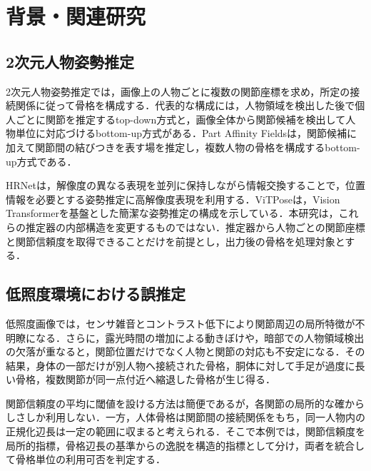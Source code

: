 \chapter{背景・関連研究}

\begin{center}
  \UsamiFictionalExampleNotice
\end{center}

\section{2次元人物姿勢推定}

2次元人物姿勢推定では，画像上の人物ごとに複数の関節座標を求め，所定の接続関係に従って骨格を構成する．代表的な構成には，人物領域を検出した後で個人ごとに関節を推定するtop-down方式と，画像全体から関節候補を検出して人物単位に対応づけるbottom-up方式がある．Part Affinity Fields\cite{cao2017partaffinity}は，関節候補に加えて関節間の結びつきを表す場を推定し，複数人物の骨格を構成するbottom-up方式である．

HRNet\cite{sun2019hrnet}は，解像度の異なる表現を並列に保持しながら情報交換することで，位置情報を必要とする姿勢推定に高解像度表現を利用する．ViTPose\cite{xu2022vitpose}は，Vision Transformerを基盤とした簡潔な姿勢推定の構成を示している．本研究は，これらの推定器の内部構造を変更するものではない．推定器から人物ごとの関節座標と関節信頼度を取得できることだけを前提とし，出力後の骨格を処理対象とする．

\section{低照度環境における誤推定}

低照度画像では，センサ雑音とコントラスト低下により関節周辺の局所特徴が不明瞭になる．さらに，露光時間の増加による動きぼけや，暗部での人物領域検出の欠落が重なると，関節位置だけでなく人物と関節の対応も不安定になる．その結果，身体の一部だけが別人物へ接続された骨格，胴体に対して手足が過度に長い骨格，複数関節が同一点付近へ縮退した骨格が生じ得る．

関節信頼度の平均に閾値を設ける方法は簡便であるが，各関節の局所的な確からしさしか利用しない．一方，人体骨格は関節間の接続関係をもち，同一人物内の正規化辺長は一定の範囲に収まると考えられる．そこで本例では，関節信頼度を局所的指標，骨格辺長の基準からの逸脱を構造的指標として分け，両者を統合して骨格単位の利用可否を判定する．

